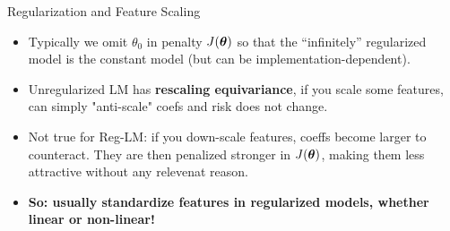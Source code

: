 \documentclass[11pt,compress,t,notes=noshow, xcolor=table]{beamer}
\begin{document}
\begin{vbframe}{Regularization and Feature Scaling}

  \begin{itemize}
    \item Typically we omit $\theta_0$ in penalty $J(\bm{\theta})$ so that the ``infinitely'' regularized model is the constant model (but can be implementation-dependent).
    \item Unregularized LM has \textbf{rescaling equivariance}, if you scale some features, can simply "anti-scale" coefs and risk does not change.
    \item Not true for Reg-LM: if you down-scale features, coeffs become larger to counteract. They are then penalized stronger in $J(\bm{\theta})$, making them less attractive without any relevenat reason.
    \item \textbf{So: usually standardize features in regularized models, whether linear or non-linear!}  
      
  \end{itemize}

\framebreak



\end{vbframe}
\end{document}
